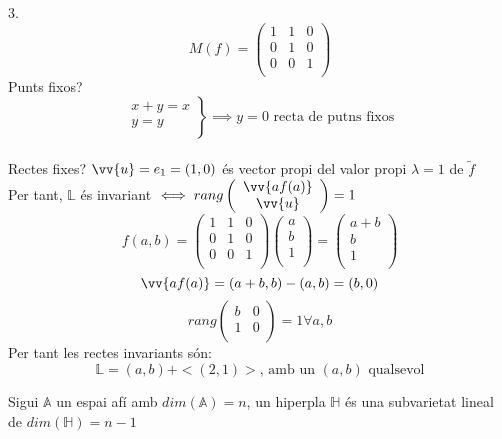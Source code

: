 \begin{exmp}3.
	\[M(f)=\left(\begin{array}{cc|c}
		1&1&0\\
		0&1&0\\ \hline
		0&0&1\\
	\end{array}\right)\]
	Punts fixos?
	\[\left.\begin{array}{r}x+y=x\\y=y\\\end{array}\right\}\implies y=0\text{ recta de putns fixos}\] \\
	Rectes fixes? $\vv{u}=e_1=(1,0)$ és vector propi del valor propi $\lambda=1$ de $\widetilde{f}$ \\
	Per tant, $\mathbb{L}$ és invariant $\iff rang\left(\begin{array}{c}\vv{af(a)}\\\vv{u}\\\end{array}\right)=1$ \\
	\[f(a,b)=\left(\begin{array}{cc|c}
		1&1&0\\
		0&1&0\\ \hline
		0&0&1\\
	\end{array}\right)\left(\begin{array}{c}a\\b\\1\\\end{array}\right)=\left(\begin{array}{c}a+b\\b\\1\\\end{array}\right)\]
	\[\vv{af(a)}=(a+b,b)-(a,b)=(b,0)\]
	\[rang\left(\begin{array}{cc}b&0\\1&0\\\end{array}\right)=1\forall a,b\]
	Per tant les rectes invariants són:
	\[\mathbb{L}=(a,b)+<(2,1)>\text{, amb un }(a,b)\text{ qualsevol}\]
\end{exmp}

\begin{defn}
	Sigui $\mathbb{A}$ un espai afí amb $dim(\mathbb{A})=n$, un hiperpla $\mathbb{H}$ és una subvarietat lineal de $dim(\mathbb{H})=n-1$
\end{defn}

